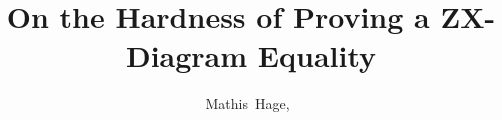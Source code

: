 \documentclass[journal,onecolumn]{IEEEtran}
\begin{document}
%
\title{On the Hardness of Proving a ZX-Diagram Equality}
%
%
%

\author{Mathis~Hage,~}

% 
%



% 
\end{document}
